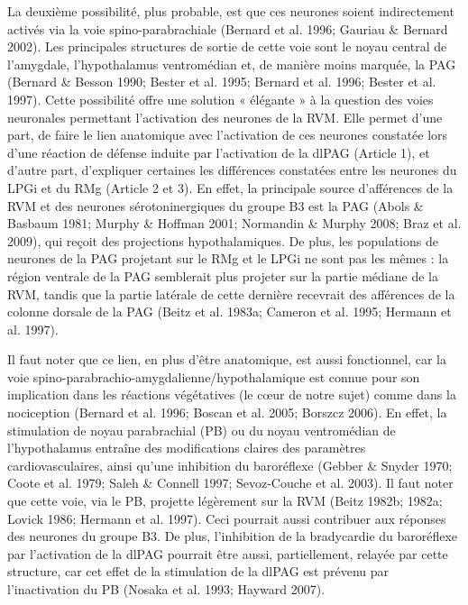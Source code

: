 \documentclass[a4paper,12pt,twoside]{report}
\begin{document}
La deuxième possibilité, plus probable, est que ces neurones soient indirectement activés via la voie spino-parabrachiale (Bernard et al. 1996; Gauriau \& Bernard 2002). Les principales structures de sortie de cette voie sont le noyau central de l’amygdale, l’hypothalamus ventromédian et, de manière moins marquée, la PAG (Bernard \& Besson 1990; Bester et al. 1995; Bernard et al. 1996; Bester et al. 1997). Cette possibilité offre une solution « élégante » à la question des voies neuronales permettant l’activation des neurones de la RVM. Elle permet d’une part, de faire le lien anatomique avec l’activation de ces neurones constatée lors d’une réaction de défense induite par l’activation de la dlPAG (Article 1), et d’autre part, d’expliquer certaines les différences constatées entre les neurones du LPGi et du RMg (Article 2 et 3). En effet, la principale source d’afférences de la RVM et des neurones sérotoninergiques du groupe B3 est la PAG (Abols \& Basbaum 1981; Murphy \& Hoffman 2001; Normandin \& Murphy 2008; Braz et al. 2009), qui reçoit des projections hypothalamiques. De plus, les populations de neurones de la PAG projetant sur le RMg et le LPGi ne sont pas les mêmes : la région ventrale de la PAG semblerait plus projeter sur la partie médiane de la RVM, tandis que la partie latérale de cette dernière recevrait des afférences de la colonne dorsale de la PAG (Beitz et al. 1983a; Cameron et al. 1995; Hermann et al. 1997). 

Il faut noter que ce lien, en plus d’être anatomique, est aussi fonctionnel, car la voie spino-parabrachio-amygdalienne/hypothalamique est connue pour son implication dans les réactions végétatives (le cœur de notre sujet) comme dans la nociception (Bernard et al. 1996; Boscan et al. 2005; Borszcz 2006). En effet, la stimulation de noyau parabrachial (PB) ou du noyau ventromédian de l’hypothalamus entraîne des modifications claires des paramètres cardiovasculaires, ainsi qu’une inhibition du baroréflexe (Gebber \& Snyder 1970; Coote et al. 1979; Saleh \& Connell 1997; Sevoz-Couche et al. 2003). Il faut noter que cette voie, via le PB, projette légèrement sur la RVM (Beitz 1982b; 1982a; Lovick 1986; Hermann et al. 1997). Ceci pourrait aussi contribuer aux réponses des neurones du groupe B3. De plus, l’inhibition de la bradycardie du baroréflexe par l’activation de la dlPAG pourrait être aussi, partiellement, relayée par cette structure, car cet effet de la stimulation de la dlPAG est prévenu par l’inactivation du PB (Nosaka et al. 1993; Hayward 2007). 
\end{document}
